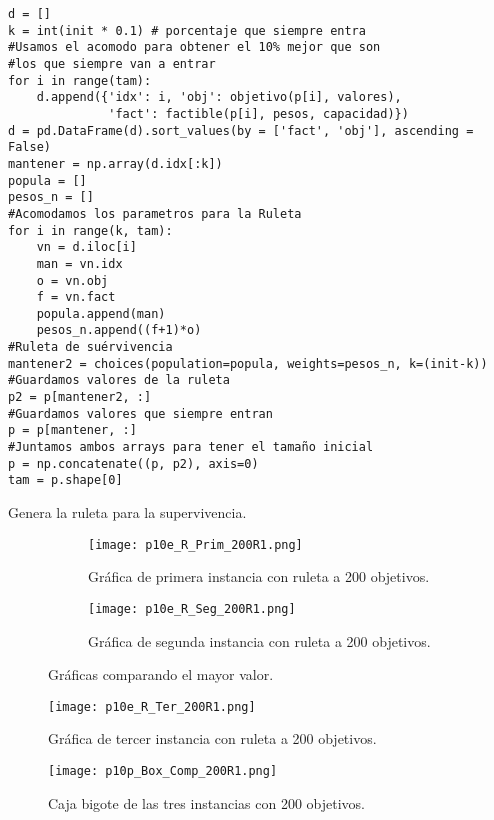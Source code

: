 \documentclass{article}
\begin{document}
\renewcommand{\listingscaption}{Código}
\begin{listing}[H]
  \begin{verbatim}
d = []
k = int(init * 0.1) # porcentaje que siempre entra
#Usamos el acomodo para obtener el 10% mejor que son 
#los que siempre van a entrar
for i in range(tam):
    d.append({'idx': i, 'obj': objetivo(p[i], valores),
              'fact': factible(p[i], pesos, capacidad)})
d = pd.DataFrame(d).sort_values(by = ['fact', 'obj'], ascending = False)
mantener = np.array(d.idx[:k])
popula = []
pesos_n = []
#Acomodamos los parametros para la Ruleta
for i in range(k, tam):
    vn = d.iloc[i]
    man = vn.idx
    o = vn.obj
    f = vn.fact
    popula.append(man)
    pesos_n.append((f+1)*o)
#Ruleta de suérvivencia
mantener2 = choices(population=popula, weights=pesos_n, k=(init-k))
#Guardamos valores de la ruleta
p2 = p[mantener2, :]
#Guardamos valores que siempre entran
p = p[mantener, :]
#Juntamos ambos arrays para tener el tamaño inicial
p = np.concatenate((p, p2), axis=0)
tam = p.shape[0]
      \end{verbatim}
  \label{lst:fibo}
  \caption{Genera la ruleta para la supervivencia.}
\end{listing}

\begin{figure}[H]
\centering
\begin{subfigure}[b]{0.40\linewidth}
\texttt{[image: p10e\_R\_Prim\_200R1.png]}
\caption{Gráfica de primera instancia con ruleta a 200 objetivos.}
\end{subfigure}
\begin{subfigure}[b]{0.40\linewidth}
\texttt{[image: p10e\_R\_Seg\_200R1.png]}
\caption{Gráfica de segunda instancia con ruleta a 200 objetivos.}
\end{subfigure}
\caption{Gráficas comparando el mayor valor.}
\label{fig:westminster}
\end{figure}

\begin{figure}[H]
\centering
\texttt{[image: p10e\_R\_Ter\_200R1.png]}
\caption{\label{fig3} Gráfica de tercer instancia con ruleta a 200 objetivos.}
\end{figure}

\begin{figure}[H]
\centering
\texttt{[image: p10p\_Box\_Comp\_200R1.png]}
\caption{\label{fig3} Caja bigote de las tres instancias con 200 objetivos.}
\end{figure}
\end{document}
